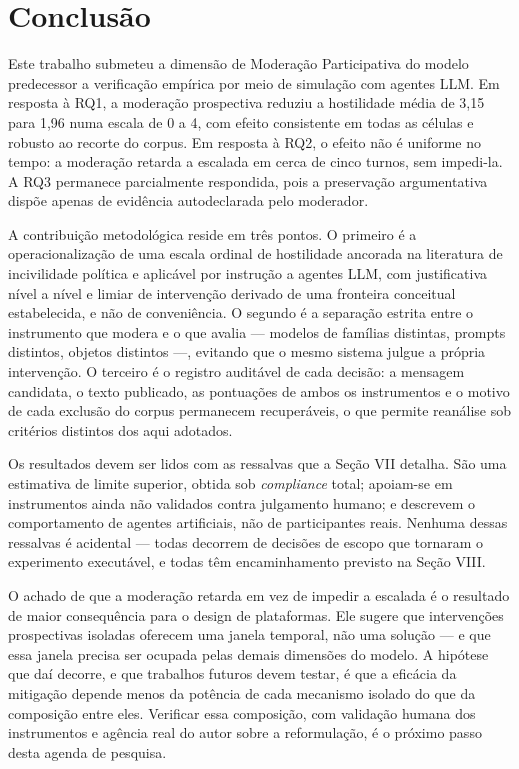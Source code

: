\documentclass[conference]{IEEEtran} \IEEEoverridecommandlockouts %
\begin{document}
\section{Conclusão}

Este trabalho submeteu a dimensão de Moderação Participativa do modelo
predecessor a verificação empírica por meio de simulação com agentes LLM. Em
resposta à RQ1, a moderação prospectiva reduziu a hostilidade média de 3,15
para 1,96 numa escala de 0 a 4, com efeito consistente em todas as células e
robusto ao recorte do corpus. Em resposta à RQ2, o efeito não é uniforme no
tempo: a moderação retarda a escalada em cerca de cinco turnos, sem impedi-la.
A RQ3 permanece parcialmente respondida, pois a preservação argumentativa
dispõe apenas de evidência autodeclarada pelo moderador.

A contribuição metodológica reside em três pontos. O primeiro é a
operacionalização de uma escala ordinal de hostilidade ancorada na literatura
de incivilidade política e aplicável por instrução a agentes LLM, com
justificativa nível a nível e limiar de intervenção derivado de uma fronteira
conceitual estabelecida, e não de conveniência. O segundo é a separação estrita
entre o instrumento que modera e o que avalia — modelos de famílias distintas,
prompts distintos, objetos distintos —, evitando que o mesmo sistema julgue a
própria intervenção. O terceiro é o registro auditável de cada decisão: a
mensagem candidata, o texto publicado, as pontuações de ambos os instrumentos e
o motivo de cada exclusão do corpus permanecem recuperáveis, o que permite
reanálise sob critérios distintos dos aqui adotados.

Os resultados devem ser lidos com as ressalvas que a Seção VII detalha. São uma
estimativa de limite superior, obtida sob \textit{compliance} total; apoiam-se
em instrumentos ainda não validados contra julgamento humano; e descrevem o
comportamento de agentes artificiais, não de participantes reais. Nenhuma
dessas ressalvas é acidental — todas decorrem de decisões de escopo que
tornaram o experimento executável, e todas têm encaminhamento previsto na
Seção VIII.

O achado de que a moderação retarda em vez de impedir a escalada é o resultado
de maior consequência para o design de plataformas. Ele sugere que intervenções
prospectivas isoladas oferecem uma janela temporal, não uma solução — e que
essa janela precisa ser ocupada pelas demais dimensões do modelo. A hipótese
que daí decorre, e que trabalhos futuros devem testar, é que a eficácia da
mitigação depende menos da potência de cada mecanismo isolado do que da
composição entre eles. Verificar essa composição, com validação humana dos
instrumentos e agência real do autor sobre a reformulação, é o próximo passo
desta agenda de pesquisa.



\end{document}
